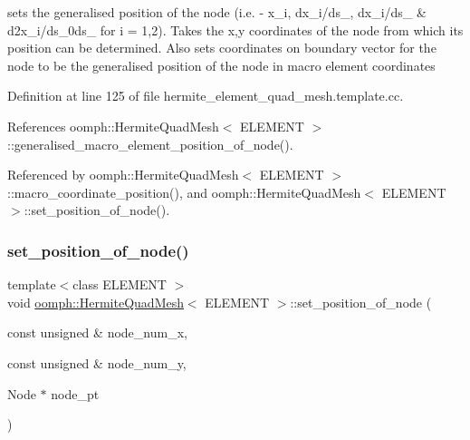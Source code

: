 sets the generalised position of the node (i.\+e. -\/ x\+\_\+i, dx\+\_\+i/ds\+\_, dx\+\_\+i/ds\+\_ \& d2x\+\_\+i/ds\+\_\+0ds\+\_ for i = 1,2). Takes the x,y coordinates of the node from which its position can be determined. Also sets coordinates on boundary vector for the node to be the generalised position of the node in macro element coordinates 



Definition at line 125 of file hermite\+\_\+element\+\_\+quad\+\_\+mesh.\+template.\+cc.



References oomph\+::\+Hermite\+Quad\+Mesh$<$ E\+L\+E\+M\+E\+N\+T $>$\+::generalised\+\_\+macro\+\_\+element\+\_\+position\+\_\+of\+\_\+node().



Referenced by oomph\+::\+Hermite\+Quad\+Mesh$<$ E\+L\+E\+M\+E\+N\+T $>$\+::macro\+\_\+coordinate\+\_\+position(), and oomph\+::\+Hermite\+Quad\+Mesh$<$ E\+L\+E\+M\+E\+N\+T $>$\+::set\+\_\+position\+\_\+of\+\_\+node().

\mbox{\label{classoomph_1_1HermiteQuadMesh_abaac1dedc4a2e578b73b0d849c9a68e8}} 
\subsubsection{\texorpdfstring{set\+\_\+position\+\_\+of\+\_\+node()}{set\_position\_of\_node()}}
{\footnotesize\ttfamily template$<$class E\+L\+E\+M\+E\+NT $>$ \\
void \hyperlink{classoomph_1_1HermiteQuadMesh}{oomph\+::\+Hermite\+Quad\+Mesh}$<$ E\+L\+E\+M\+E\+NT $>$\+::set\+\_\+position\+\_\+of\+\_\+node (\begin{DoxyParamCaption}\item[{const unsigned \&}]{node\+\_\+num\+\_\+x,  }\item[{const unsigned \&}]{node\+\_\+num\+\_\+y,  }\item[{Node $\ast$}]{node\+\_\+pt }\end{DoxyParamCaption})\hspace{0.3cm}{\ttfamily [private]}}



